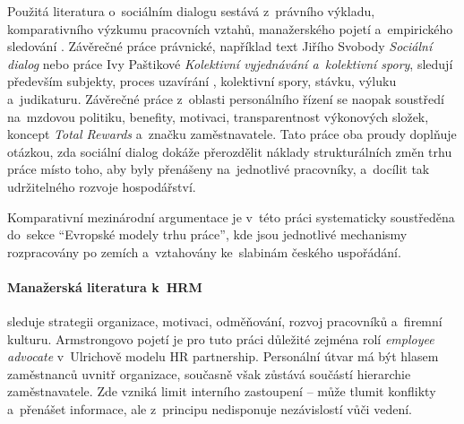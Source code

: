 
Použitá literatura o~sociálním dialogu sestává z~právního výkladu, komparativního výzkumu pracovních vztahů, manažerského pojetí  a~empirického sledování . Závěrečné práce právnické, například text Jiřího Svobody \emph{Sociální dialog} nebo práce Ivy Paštikové \emph{Kolektivní vyjednávání a~kolektivní spory}, sledují především subjekty, proces uzavírání , kolektivní spory, stávku, výluku a~judikaturu. Závěrečné práce z~oblasti personálního řízení se naopak soustředí na~mzdovou politiku, benefity, motivaci, transparentnost výkonových složek, koncept \textit{Total Rewards} a~značku zaměstnavatele. Tato práce oba proudy doplňuje otázkou, zda sociální dialog dokáže přerozdělit náklady strukturálních změn trhu práce místo toho, aby byly přenášeny na~jednotlivé pracovníky, a~docílit tak udržitelného rozvoje hospodářství.\par


Komparativní mezinárodní argumentace je v~této práci systematicky soustředěna do~sekce \enquote{Evropské modely trhu práce}, kde jsou jednotlivé mechanismy rozpracovány po zemích a~vztahovány ke~slabinám českého uspořádání.\par

\paragraph{Manažerská literatura k~\acs{HRM}} sleduje strategii organizace, motivaci, odměňování, rozvoj pracovníků a~firemní kulturu. Armstrongovo pojetí  je pro tuto práci důležité zejména rolí \textit{employee advocate} v~Ulrichově modelu HR partnership. Personální útvar má být hlasem zaměstnanců uvnitř organizace, současně však zůstává součástí hierarchie zaměstnavatele. Zde vzniká limit interního zastoupení -- může tlumit konflikty a~přenášet informace, ale z~principu nedisponuje nezávislostí vůči vedení.\par


